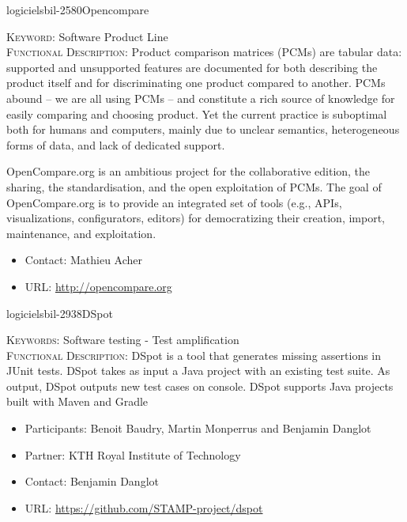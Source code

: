 \documentclass{ra2018}
\begin{document}
 \begin{module}{logiciels}{bil-2580}{Opencompare}

   \textsc{Keyword:} Software Product Line \\ 


   

 \textsc{Functional Description:}  Product comparison matrices (PCMs) are tabular data: supported and unsupported features are documented for both describing the product itself and for discriminating one product compared to another. PCMs abound – we are all using PCMs – and constitute a rich source of knowledge for easily comparing and choosing product. Yet the current practice is suboptimal both for humans and computers, mainly due to unclear semantics, heterogeneous forms of data, and lack of dedicated support. 

OpenCompare.org is an ambitious project for the collaborative edition, the sharing, the standardisation, and the open exploitation of PCMs. The goal of OpenCompare.org is to provide an integrated set of tools (e.g., APIs, visualizations, configurators, editors) for democratizing their creation, import, maintenance, and exploitation.\\

   \begin{itemize}
      \item Contact: Mathieu Acher
      \item URL: \url{http://opencompare.org}
   \end{itemize}

 \end{module}

 \begin{module}{logiciels}{bil-2938}{DSpot}

   \textsc{Keywords:} Software testing - Test amplification \\ 


   

 \textsc{Functional Description:}  DSpot is a tool that generates missing assertions in JUnit tests. DSpot takes as input a Java project with an existing test suite. As output, DSpot outputs new test cases on console. DSpot supports Java projects built with Maven and Gradle\\

   \begin{itemize}
      \item Participants: Benoit Baudry, Martin Monperrus and Benjamin Danglot
      \item Partner: KTH Royal Institute of Technology
      \item Contact: Benjamin Danglot
      \item URL: \url{https://github.com/STAMP-project/dspot}
   \end{itemize}

 \end{module}
\end{document}
